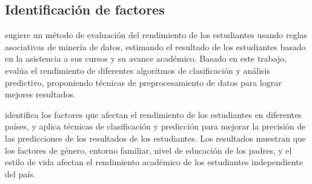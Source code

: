

\subsection*{Identificación de factores}
\textcite{borkar2013predicting} sugiere un método de evaluación del rendimiento de los estudiantes usando reglas asociativas de minería de datos, estimando el resultado de los estudiantes basado en la asistencia a sus cursos y su avance académico. Basado en este trabajo, \textcite{shazmeen2013performance} evalúa el rendimiento de diferentes algoritmos de clasificación y análisis predictivo, proponiendo técnicas de preprocesamiento de datos para lograr mejores resultados.

\textcite{oskouei2014predicting} identifica los factores que afectan el rendimiento de los estudiantes en diferentes países, y aplica técnicas de clasificación y predicción para mejorar la precisión de las predicciones de los resultados de los estudiantes. Los resultados muestran que los factores de género, entorno familiar, nivel de educación de los padres, y el estilo de vida afectan el rendimiento académico de los estudiantes independiente del país.





